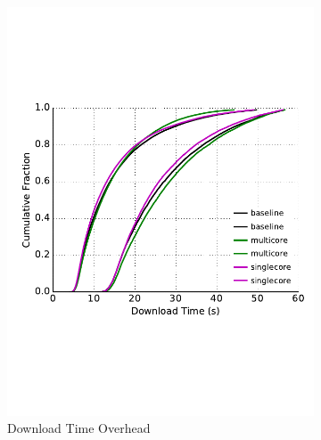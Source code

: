 \begin{figure}
\begin{subfigure}[t]{0.32\textwidth}
\includegraphics[trim={0 3cm 0 3cm}, clip, width=1.0\textwidth]{images/overhead_downloadtime.pdf}
		\caption{Download Time Overhead}
		\label{fig:overhead_ttlastbyte}
	\end{subfigure}
	\begin{subfigure}[t]{0.32\textwidth} \centering

\end{subfigure}
\end{figure}
